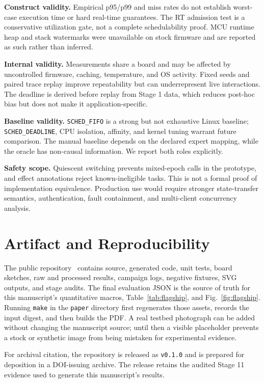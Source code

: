\documentclass[conference]{IEEEtran}
\begin{document}
\textbf{Construct validity.} Empirical p95/p99 and miss rates do not establish
worst-case execution time or hard real-time guarantees. The RT admission test
is a conservative utilization gate, not a complete schedulability proof. MCU
runtime heap and stack watermarks were unavailable on stock firmware and are
reported as such rather than inferred.

\textbf{Internal validity.} Measurements share a board and may be affected by
uncontrolled firmware, caching, temperature, and OS activity. Fixed seeds and
paired trace replay improve repeatability but can underrepresent live
interactions. The deadline is derived before replay from Stage 1 data, which
reduces post-hoc bias but does not make it application-specific.

\textbf{Baseline validity.} \texttt{SCHED\_FIFO} is a strong but not exhaustive
Linux baseline; \texttt{SCHED\_DEADLINE}, CPU isolation, affinity, and kernel
tuning warrant future comparison. The manual baseline depends on the declared
expert mapping, while the oracle has non-causal information. We report both
roles explicitly.

\textbf{Safety scope.} Quiescent switching prevents mixed-epoch calls in the
prototype, and effect annotations reject known-ineligible tasks. This is not a
formal proof of implementation equivalence. Production use would require
stronger state-transfer semantics, authentication, fault containment, and
multi-client concurrency analysis.

\section{Artifact and Reproducibility}
The public repository~\cite{qfabric2026} contains source, generated code, unit
tests, board sketches, raw and processed results, campaign logs, negative
fixtures, SVG outputs, and stage audits. The final evaluation JSON is the source
of truth for this manuscript's quantitative macros, Table~\ref{tab:flagship},
and Fig.~\ref{fig:flagship}. Running
\texttt{make} in the \texttt{paper} directory first regenerates those assets,
records the input digest, and then builds the PDF. A real testbed photograph can
be added without changing the manuscript source; until then a visible
placeholder prevents a stock or synthetic image from being mistaken for
experimental evidence.

For archival citation, the repository is released as \texttt{v0.1.0} and is
prepared for deposition in a DOI-issuing archive. The release retains the
audited Stage 11 evidence used to generate this manuscript's results.
\end{document}
